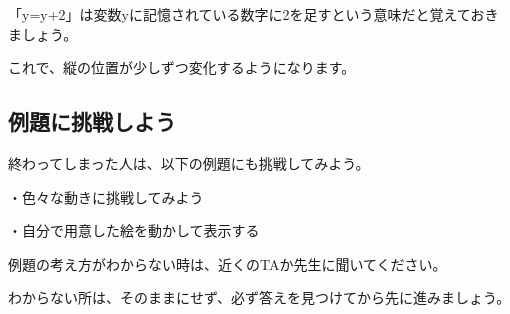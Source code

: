 \begin{description}
    \item {}
    \item {}
    \item {}
\end{description}



「y=y+2」は変数yに記憶されている数字に2を足すという意味だと覚えておきましょう。

これで、縦の位置が少しずつ変化するようになります。
\newpage
\subsection{例題に挑戦しよう}


終わってしまった人は、以下の例題にも挑戦してみよう。

・色々な動きに挑戦してみよう

・自分で用意した絵を動かして表示する

例題の考え方がわからない時は、近くのTAか先生に聞いてください。

わからない所は、そのままにせず、必ず答えを見つけてから先に進みましょう。



